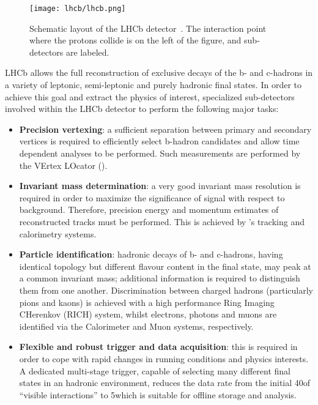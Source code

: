 \begin{figure}[tb]
\begin{center}
\texttt{[image: lhcb/lhcb.png]}
\end{center}
\caption{\small Schematic layout of the LHCb detector~\cite{Alves:2008zz}. 
The interaction point where the protons collide is on the left of the figure, 
and sub-detectors are labeled.}
\label{fig:lhcb}
\end{figure}

LHCb allows the full reconstruction of exclusive decays of the b- and c-hadrons
in a variety of leptonic, semi-leptonic and purely hadronic final states. 
In order to achieve this goal and extract the physics of interest, 
specialized sub-detectors involved within the LHCb detector to perform the 
following major tasks:

\begin{itemize}

\item {\bf Precision vertexing}: a sufficient separation between primary and 
secondary vertices is required to efficiently select b-hadron candidates 
and allow time dependent analyses to be performed. Such measurements are 
performed by the VErtex LOcator (\velo).

\item {\bf Invariant mass determination}: a very good invariant mass
resolution is required in order to maximize the significance of signal with
respect to background. Therefore, precision energy and momentum estimates of
reconstructed tracks must be performed. This is achieved by \lhcb's tracking
and calorimetry systems.

\item {\bf Particle identification}: hadronic decays of b- and c-hadrons, 
having identical topology but different flavour content in the final state, 
may peak at a common invariant mass; additional information is required to 
distinguish them from one another. 
Discrimination between charged hadrons (particularly pions and kaons) is 
achieved with a high performance Ring Imaging CHerenkov (RICH) system, 
whilst electrons, photons and muons are identified via the 
Calorimeter and Muon systems, respectively.

\item {\bf Flexible and robust trigger and data acquisition}: this is required 
in order to cope with rapid changes in running conditions and physics 
interests. A dedicated multi-stage trigger, capable of selecting many different 
final states in an hadronic environment, reduces the data rate from the initial 
40\mhz of ``visible interactions'' to 5\khz which is suitable for 
offline storage and analysis.
\end{itemize}

